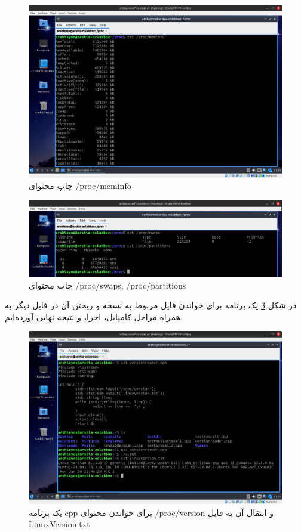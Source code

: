 \documentclass[12pt]{article}
\begin{document}
	\begin{figure}[H]
		\centering
		\includegraphics[width=\textwidth]{report3-resources/5.png}
		\caption{چاپ محتوای \textenglish{/proc/meminfo}}
		\label{fig:5}
	\end{figure}
	\begin{figure}[H]
		\centering
		\includegraphics[width=\textwidth]{report3-resources/6.png}
		\caption{چاپ محتوای \textenglish{/proc/swaps, /proc/partitions}}
		\label{fig:6}
	\end{figure}
	در شکل \ref{fig:7} یک برنامه برای خواندن فایل مربوط به نسخه و ریختن آن در فایل دیگر به همراه مراحل کامپایل، اجرا، و نتیجه نهایی آورده‌ایم.
	\begin{figure}[H]
		\centering
		\includegraphics[width=\textwidth]{report3-resources/7.png}
		\caption{یک برنامه cpp برای خواندن محتوای \textenglish{/proc/version} و انتقال آن به فایل \textenglish{LinuxVersion.txt}}
		\label{fig:7}
	\end{figure}
\end{document}
